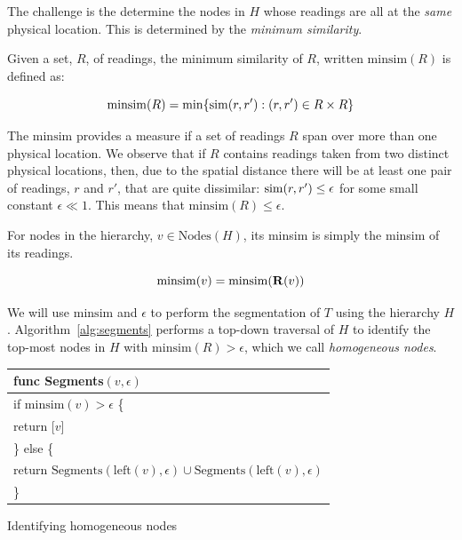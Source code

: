 The challenge is the determine the nodes in $H$ whose readings are all at the
{\em same} physical location.  This is determined by the {\em minimum
similarity}.

\begin{definition}
    Given a set, $R$, of readings, the minimum similarity of $R$, written
    $\mathrm{minsim}(R)$ is defined as:

    $$\mathrm{minsim}(R) = \min\{\mathrm{sim}(r,r'): (r,r')\in R\times R\}$$
    \label{def:minsim}
\end{definition}

The $\mathrm{minsim}$ provides a measure if a set of readings $R$ span over more
than one physical location.
We observe that if $R$ contains readings taken from two distinct physical
locations, then, due to the spatial distance there will be at least one pair of
readings, $r$ and $r'$, that are quite dissimilar: $\mathrm{sim}(r, r') \leq \epsilon$ for some
small constant $\epsilon\ll 1$.  This means that $\mathrm{minsim}(R)\leq \epsilon$.

For nodes in the hierarchy, $v\in\mathrm{Nodes}(H)$, its minsim is simply the
minsim of its readings.

\begin{definition}
    $$\mathrm{minsim}(v) = \mathrm{minsim}(\mathbf{R}(v))$$
\end{definition}

We will use $\mathrm{minsim}$ and $\epsilon$ to perform the segmentation of $T$
using the hierarchy $H$.  Algorithm~\ref{alg:segments} performs a top-down
traversal of $H$ to identify the top-most nodes in $H$ with 
$\mathrm{minsim}(R) > \epsilon$, which we call {\em homogeneous nodes}.

\begin{algorithm}[t]
    \centering
    \begin{tabular}{|l|}\hline
        func Segments$(v, \epsilon)$ \\ \hline
        if $\mathrm{minsim}(v) > \epsilon$ \{ \\
        \RRR return [$v$] \\
        \} else \{ \\
        \RRR return $\mathrm{Segments}(\mathrm{left}(v), \epsilon) \cup
                      \mathrm{Segments}(\mathrm{left}(v), \epsilon)$ \\
        \} \\ \hline
    \end{tabular}
    \vspace{0.4cm}
    \caption{Identifying homogeneous nodes}
    \label{alg:segments}
\end{algorithm}

